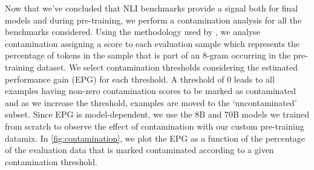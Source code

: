 Now that we've concluded that NLI benchmarks provide a signal both for final models and during pre-training, we perform a contamination analysis for all the benchmarks considered.
Using the methodology used by \citep{dubey2024llama}, we analyse contamination assigning a score to each evaluation sample which represents the percentage of tokens in the sample that is part of an 8-gram occurring in the pre-training dataset.
We select contamination thresholds considering the estimated performance gain (EPG) for each threshold.
A threshold of 0 leads to all examples having non-zero contamination scores to be marked as contaminated and as we increase the threshold, examples are moved to the `uncontaminated' subset. Since EPG is model-dependent, we use the 8B and 70B models we trained from scratch to observe the effect of contamination with our custom pre-training datamix.
In \cref{fig:contamination}, we plot the EPG as a function of the percentage of the evaluation data that is marked contaminated according to a given contamination threshold.

